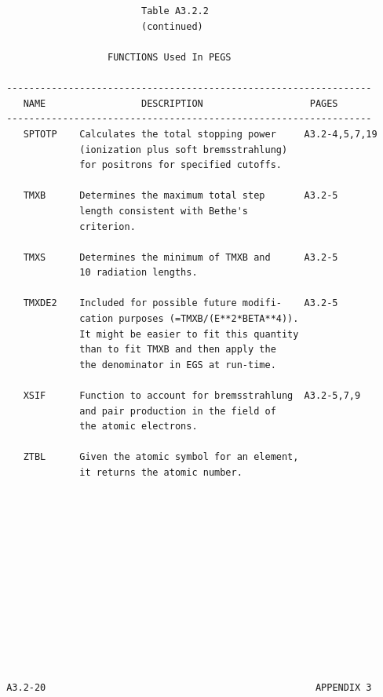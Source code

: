 \newpage  {}\begin{verbatim}


                         Table A3.2.2
                         (continued)

                   FUNCTIONS Used In PEGS

 -----------------------------------------------------------------
    NAME                 DESCRIPTION                   PAGES
 -----------------------------------------------------------------
    SPTOTP    Calculates the total stopping power     A3.2-4,5,7,19
              (ionization plus soft bremsstrahlung)
              for positrons for specified cutoffs.

    TMXB      Determines the maximum total step       A3.2-5
              length consistent with Bethe's
              criterion.

    TMXS      Determines the minimum of TMXB and      A3.2-5
              10 radiation lengths.

    TMXDE2    Included for possible future modifi-    A3.2-5
              cation purposes (=TMXB/(E**2*BETA**4)).
              It might be easier to fit this quantity
              than to fit TMXB and then apply the
              the denominator in EGS at run-time.

    XSIF      Function to account for bremsstrahlung  A3.2-5,7,9
              and pair production in the field of
              the atomic electrons.

    ZTBL      Given the atomic symbol for an element,
              it returns the atomic number.













 A3.2-20                                                APPENDIX 3
\end{verbatim}
\newpage {} 
   
\label{pegs4_input}
